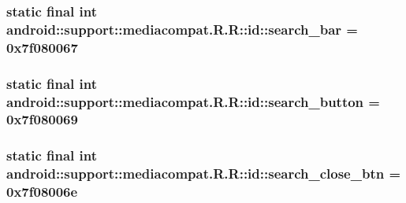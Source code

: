 \hypertarget{classandroid_1_1support_1_1mediacompat_1_1_r_1_1id_4fa978c4eaf0bfea6b82e7c5321fac56}{
\subsubsection[{search\_\-bar}]{\setlength{\rightskip}{0pt plus 5cm}static final int android::support::mediacompat.R.R::id::search\_\-bar = 0x7f080067}}
\label{classandroid_1_1support_1_1mediacompat_1_1_r_1_1id_4fa978c4eaf0bfea6b82e7c5321fac56}


\hypertarget{classandroid_1_1support_1_1mediacompat_1_1_r_1_1id_238df7ec871716aef657d48e00c7a323}{
\subsubsection[{search\_\-button}]{\setlength{\rightskip}{0pt plus 5cm}static final int android::support::mediacompat.R.R::id::search\_\-button = 0x7f080069}}
\label{classandroid_1_1support_1_1mediacompat_1_1_r_1_1id_238df7ec871716aef657d48e00c7a323}


\hypertarget{classandroid_1_1support_1_1mediacompat_1_1_r_1_1id_a5337d318cbb15a70197809e63e7df25}{
\subsubsection[{search\_\-close\_\-btn}]{\setlength{\rightskip}{0pt plus 5cm}static final int android::support::mediacompat.R.R::id::search\_\-close\_\-btn = 0x7f08006e}}
\label{classandroid_1_1support_1_1mediacompat_1_1_r_1_1id_a5337d318cbb15a70197809e63e7df25}


